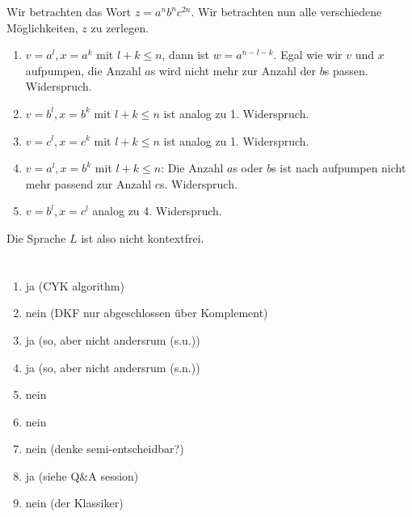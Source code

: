 \documentclass{article}
\begin{document}
Wir betrachten das Wort $z = a^nb^nc^{2n}$. Wir betrachten nun alle verschiedene Möglichkeiten, $z$ zu zerlegen.
\begin{enumerate}
	\item $v = a^l, x = a^k$ mit $l + k \leq n$, dann ist $w = a^{n-l-k}$. Egal wie wir $v$ und $x$ aufpumpen, die Anzahl $a$s wird nicht mehr zur Anzahl der $b$s passen. Widerspruch.
  \item $v = b^l, x = b^k$ mit $l + k \leq n$ ist analog zu 1. Widerspruch.
  \item $v = c^l, x = c^k$ mit $l + k \leq n$ ist analog zu 1. Widerspruch.
  \item $v = a^l, x = b^k$ mit $l + k \leq n$: Die Anzahl $a$s oder $b$s ist nach aufpumpen nicht mehr passend zur Anzahl $c$s. Widerspruch.
  \item $v = b^l, x = c^l$ analog zu 4. Widerspruch.
\end{enumerate}
Die Sprache $L$ ist also nicht kontextfrei.

\section{}%

\section{}%
\begin{enumerate}
	\item ja (CYK algorithm)
	\item nein (DKF nur abgeschlossen über Komplement)
	\item ja (so, aber nicht andersrum (s.u.))
	\item ja (so, aber nicht andersrum (s.n.))
	\item nein 
	\item nein 
	\item nein (denke semi-entscheidbar?)
	\item ja (siehe Q\&A session)
	\item nein (der Klassiker)
\end{enumerate}
\end{document}
